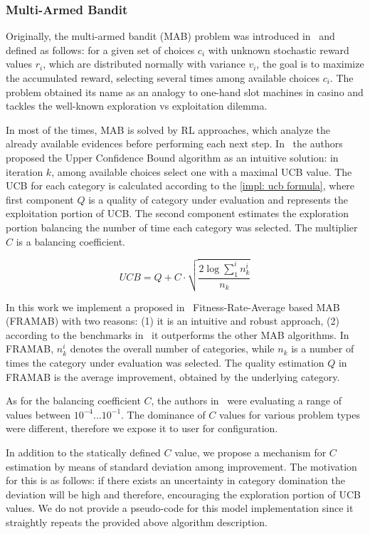 \subsubsection{Multi-Armed Bandit}\label{impl: FRAMAB}
Originally, the multi-armed bandit (MAB) problem was introduced in~\cite{robbins1952some} and defined as follows: for a given set of choices $c_i$ with unknown stochastic reward values $r_i$, which are distributed normally with variance $v_i$, the goal is to maximize the accumulated reward, selecting several times among available choices $c_i$. The problem obtained its name as an analogy to one-hand slot machines in casino and tackles the well-known exploration vs exploitation dilemma.

In most of the times, MAB is solved by RL approaches, which analyze the already available evidences before performing each next step. In~\cite{auer2002finite} the authors proposed the Upper Confidence Bound algorithm as an intuitive solution: in iteration $k$, among available choices select one with a maximal UCB value. The UCB for each category is calculated according to the \cref{impl: ucb formula}, where first component $Q$ is a quality of category under evaluation and represents the exploitation portion of UCB. The second component estimates the exploration portion balancing the number of time each category was selected. The multiplier $C$ is a balancing coefficient.

\begin{equation}
UCB = Q + C \cdot \sqrt{\frac{2 \log \sum_{1}^{i} n_k^i}{n_k}}
\label{impl: ucb formula}
\end{equation}

In this work we implement a proposed in~\cite{li2013adaptive} Fitness-Rate-Average based MAB (FRAMAB) with two reasons: (1) it is an intuitive and robust approach, (2) according to the benchmarks in~\cite{ferreira2017multi} it outperforms the other MAB algorithms. In FRAMAB, $n_k^i$ denotes the overall number of categories, while $n_k$ is a number of times the category under evaluation was selected. The quality estimation $Q$ in FRAMAB is the average improvement, obtained by the underlying category.

As for the balancing coefficient $C$, the authors in~\cite{ferreira2017multi} were evaluating a range of values between $10^{-4}...10^{-1}$. The dominance of $C$ values for various problem types were different, therefore we expose it to user for configuration. 

In addition to the statically defined $C$ value, we propose a mechanism for $C$ estimation by means of standard deviation among improvement. The motivation for this is as follows: if there exists an uncertainty in category domination the deviation will be high and therefore, encouraging the exploration portion of UCB values. We do not provide a pseudo-code for this model implementation since it straightly repeats the provided above algorithm description.


